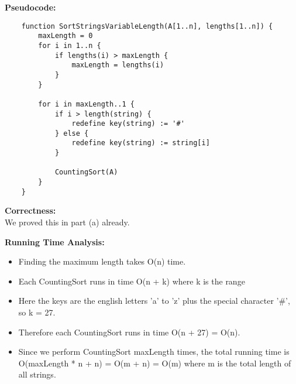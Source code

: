\documentclass{article}
\begin{document}
\textbf{Pseudocode:}
\begin{verbatim}
    function SortStringsVariableLength(A[1..n], lengths[1..n]) {
        maxLength = 0
        for i in 1..n {
            if lengths(i) > maxLength {
                maxLength = lengths(i)
            }
        }

        for i in maxLength..1 {
            if i > length(string) {
                redefine key(string) := '#'
            } else {
                redefine key(string) := string[i]
            }

            CountingSort(A)
        }
    }
\end{verbatim}

\textbf{Correctness:} \\
We proved this in part (a) already.

\textbf{Running Time Analysis:}
\begin{itemize}
    \item Finding the maximum length takes O(n) time.
    \item Each CountingSort runs in time O(n + k) where k is the range
    \item Here the keys are the english letters 'a' to 'z' plus the special character '\#', so k = 27.
    \item Therefore each CountingSort runs in time O(n + 27) = O(n).
    \item Since we perform CountingSort maxLength times, the total running time is O(maxLength * n + n) = O(m + n) = O(m) where m is the total length of all strings.
\end{itemize}
\end{document}
